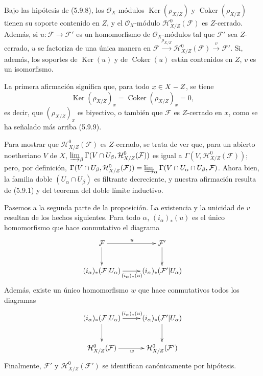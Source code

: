 \begin{proposition}[5.9.11]
\label{IV.2.s5.9.11-fr}
Bajo las hipótesis de \textup{(5.9.8)}, los $\mathcal O_X$-módulos
$\operatorname{Ker}(\rho_{X/Z})$ y $\operatorname{Coker}(\rho_{X/Z})$ tienen
su soporte contenido en $Z$, y el $\mathcal O_X$-módulo
$\mathcal H^0_{X/Z}(\mathcal F)$ es $Z$-cerrado. Además, si
$u:\mathcal F\to\mathcal F'$ es un homomorfismo de
$\mathcal O_X$-módulos tal que $\mathcal F'$ sea $Z$-cerrado, $u$ se factoriza
de una única manera en
$\mathcal F\xrightarrow{\rho_{X/Z}}\mathcal H^0_{X/Z}(\mathcal F)
\xrightarrow{v}\mathcal F'$.
Si, además, los soportes de $\operatorname{Ker}(u)$ y de
$\operatorname{Coker}(u)$ están contenidos en $Z$, $v$ es un isomorfismo.
\end{proposition}

La primera afirmación significa que, para todo $x\in X- Z$, se tiene
\[
\operatorname{Ker}(\rho_{X/Z})_x
=\operatorname{Coker}(\rho_{X/Z})_x=0,
\]
es decir, que $(\rho_{X/Z})_x$ es biyectivo, o también que $\mathcal F$ es
$Z$-cerrado en $x$, como se ha señalado más arriba (5.9.9).

Para mostrar que $\mathcal H^0_{X/Z}(\mathcal F)$ es $Z$-cerrado, se trata de
ver que, para un abierto noetheriano $V$ de $X$,
$\varinjlim_\beta
\Gamma(V\cap U_\beta,\mathcal H^0_{X/Z}(\mathcal F))$
es igual a $\Gamma(V,\mathcal H^0_{X/Z}(\mathcal F))$; pero, por definición,
$\Gamma(V\cap U_\beta,\mathcal H^0_{X/Z}(\mathcal F))
=\varinjlim_\alpha\Gamma(V\cap U_\alpha\cap U_\beta,\mathcal F)$.
Ahora bien, la familia doble $(U_\alpha\cap U_\beta)$ es filtrante decreciente,
y nuestra afirmación resulta de (5.9.1) y del teorema del doble límite
inductivo.


Pasemos a la segunda parte de la proposición. La existencia y la unicidad de
$v$ resultan de los hechos siguientes. Para todo $\alpha$, $(i_\alpha)_*(u)$
es el único homomorfismo que hace conmutativo el diagrama
\[
\xymatrix{
\mathcal F\ar[r]^u\ar[d] & \mathcal F'\ar[d]\\
(i_\alpha)_*(\mathcal F|U_\alpha)
\ar[r]_{(i_\alpha)_*(u)} &
(i_\alpha)_*(\mathcal F'|U_\alpha)
}
\]
Además, existe un único homomorfismo $w$ que hace conmutativos todos los
diagramas
\[
\xymatrix{
(i_\alpha)_*(\mathcal F|U_\alpha)
\ar[r]^{(i_\alpha)_*(u)}\ar[d] &
(i_\alpha)_*(\mathcal F'|U_\alpha)\ar[d]\\
\mathcal H^0_{X/Z}(\mathcal F)\ar[r]_w &
\mathcal H^0_{X/Z}(\mathcal F')
}
\]
Finalmente, $\mathcal F'$ y $\mathcal H^0_{X/Z}(\mathcal F')$ se identifican
canónicamente por hipótesis.


